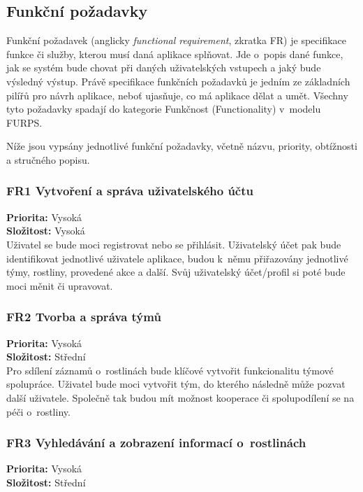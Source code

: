 \documentclass[thesis=M,czech]{FITthesis}[2019/12/23]
\begin{document}
\subsection{Funkční požadavky}
\label{doc:fr}
Funkční požadavek (anglicky \textit{functional requirement}, zkratka FR) je specifikace funkce či služby, kterou musí daná aplikace splňovat. Jde o~popis dané funkce, jak se systém bude chovat při daných uživatelských vstupech a jaký bude výsledný výstup. Právě specifikace funkčních požadavků je jedním ze základních pilířů pro návrh aplikace, neboť ujasňuje, co má aplikace dělat a umět. Všechny tyto požadavky spadají do kategorie Funkčnost (Functionality) v~modelu FURPS. \cite{functional-requirements}

Níže jsou vypsány jednotlivé funkční požadavky, včetně názvu, priority, obtížnosti a stručného popisu.

\subsubsection*{FR1 Vytvoření a správa uživatelského účtu}
\textbf{Priorita:} Vysoká \\
\textbf{Složitost:} Vysoká \\

Uživatel se bude moci registrovat nebo se přihlásit. Uživatelský účet pak bude identifikovat jednotlivé uživatele aplikace, budou k~němu přiřazovány jednotlivé týmy, rostliny, provedené akce a další. Svůj uživatelský účet/profil si poté bude moci měnit či upravovat.

\subsubsection*{FR2 Tvorba a správa týmů}
\textbf{Priorita:} Vysoká \\
\textbf{Složitost:} Střední \\

Pro sdílení záznamů o~rostlinách bude klíčové vytvořit funkcionalitu týmové spolupráce. Uživatel bude moci vytvořit tým, do kterého následně může pozvat další uživatele. Společně tak budou mít možnost kooperace či spolupodílení se na péči o~rostliny.

\subsubsection*{FR3 Vyhledávání a zobrazení informací o~rostlinách}
\textbf{Priorita:} Vysoká \\
\textbf{Složitost:} Střední \\
\end{document}
